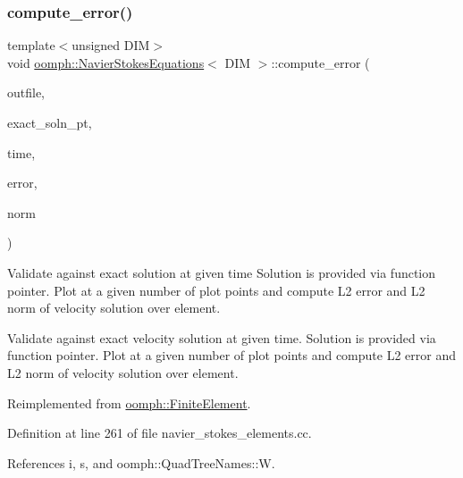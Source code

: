 \mbox{\label{classoomph_1_1NavierStokesEquations_a393869e2b73a8fa16ed8988f27c61765}} 
\subsubsection{\texorpdfstring{compute\+\_\+error()}{compute\_error()}\hspace{0.1cm}{\footnotesize\ttfamily [1/2]}}
{\footnotesize\ttfamily template$<$unsigned D\+IM$>$ \\
void \hyperlink{classoomph_1_1NavierStokesEquations}{oomph\+::\+Navier\+Stokes\+Equations}$<$ D\+IM $>$\+::compute\+\_\+error (\begin{DoxyParamCaption}\item[{std\+::ostream \&}]{outfile,  }\item[{\hyperlink{classoomph_1_1FiniteElement_ad4ecf2b61b158a4b4d351a60d23c633e}{Finite\+Element\+::\+Unsteady\+Exact\+Solution\+Fct\+Pt}}]{exact\+\_\+soln\+\_\+pt,  }\item[{const double \&}]{time,  }\item[{double \&}]{error,  }\item[{double \&}]{norm }\end{DoxyParamCaption})\hspace{0.3cm}{\ttfamily [virtual]}}



Validate against exact solution at given time Solution is provided via function pointer. Plot at a given number of plot points and compute L2 error and L2 norm of velocity solution over element. 

Validate against exact velocity solution at given time. Solution is provided via function pointer. Plot at a given number of plot points and compute L2 error and L2 norm of velocity solution over element. 

Reimplemented from \hyperlink{classoomph_1_1FiniteElement_a7f67853506dc73fa6b7505108de22d1f}{oomph\+::\+Finite\+Element}.



Definition at line 261 of file navier\+\_\+stokes\+\_\+elements.\+cc.



References i, s, and oomph\+::\+Quad\+Tree\+Names\+::W.



